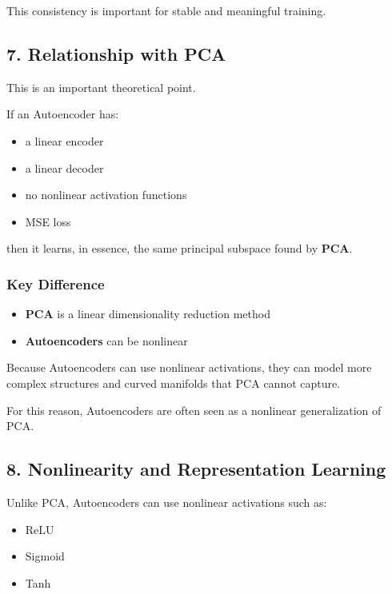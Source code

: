 \documentclass[
  italian,
  11pt,
]{article}
\begin{document}
This consistency is important for stable and meaningful training.

\subsection{7. Relationship with PCA}\label{relationship-with-pca}

This is an important theoretical point.

If an Autoencoder has:

\begin{itemize}
\item
  a linear encoder
\item
  a linear decoder
\item
  no nonlinear activation functions
\item
  MSE loss
\end{itemize}

then it learns, in essence, the same principal subspace found by
\textbf{PCA}.

\subsubsection{Key Difference}\label{key-difference}

\begin{itemize}
\item
  \textbf{PCA} is a linear dimensionality reduction method
\item
  \textbf{Autoencoders} can be nonlinear
\end{itemize}

Because Autoencoders can use nonlinear activations, they can model more
complex structures and curved manifolds that PCA cannot capture.

For this reason, Autoencoders are often seen as a nonlinear
generalization of PCA.

\subsection{8. Nonlinearity and Representation
Learning}\label{nonlinearity-and-representation-learning}

Unlike PCA, Autoencoders can use nonlinear activations such as:

\begin{itemize}
\item
  ReLU
\item
  Sigmoid
\item
  Tanh
\end{itemize}
\end{document}
